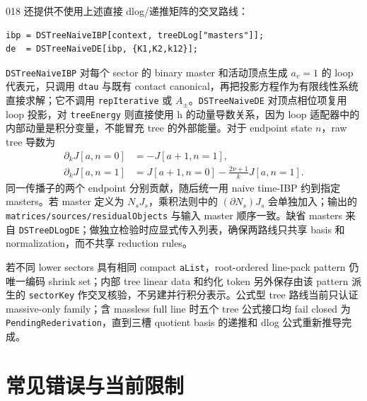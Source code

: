﻿\documentclass[a4paper,11pt]{article}
\begin{document}
018 还提供不使用上述直接 dlog/递推矩阵的交叉路线：
\begin{verbatim}
ibp = DSTreeNaiveIBP[context, treeDLog["masters"]];
de  = DSTreeNaiveDE[ibp, {K1,K2,k12}];
\end{verbatim}
\texttt{DSTreeNaiveIBP} 对每个 sector 的 binary master 和活动顶点生成 $a_v=1$ 的 loop 代表元，只调用 \texttt{dtau} 与既有 contact canonical，再把投影方程作为有限线性系统直接求解；它不调用 \texttt{repIterative} 或 $A_\pm$。\texttt{DSTreeNaiveDE} 对顶点相位项复用 loop 投影，对 \texttt{treeEnergy} 则直接使用 h 的动量导数关系，因为 loop 适配器中的内部动量是积分变量，不能冒充 tree 的外部能量。对于 endpoint state $n$，raw tree 导数为
\begin{align}
 \partial_k J[a,n=0]&=-J[a+1,n=1],\\
 \partial_k J[a,n=1]&=J[a+1,n=0]-\frac{2\nu+1}{k}J[a,n=1].
\end{align}
同一传播子的两个 endpoint 分别贡献，随后统一用 naive time-IBP 约到指定 masters。若 master 定义为 $N_sJ_s$，乘积法则中的 $(\partial N_s)J_s$ 会单独加入；输出的 \texttt{matrices/sources/residualObjects} 与输入 master 顺序一致。缺省 masters 来自 \texttt{DSTreeDLogDE}；做独立检验时应显式传入列表，确保两路线只共享 basis 和 normalization，而不共享 reduction rules。

若不同 lower sectors 具有相同 compact \texttt{aList}，root-ordered line-pack pattern 仍唯一编码 shrink set；内部 tree linear data 和约化 token 另外保存由该 pattern 派生的 \texttt{sectorKey} 作交叉核验，不另建并行积分表示。公式型 tree 路线当前只认证 massive-only family；含 massless full line 时五个 tree 公式接口均 fail closed 为 \texttt{PendingRederivation}，直到三槽 quotient basis 的递推和 dlog 公式重新推导完成。

\section{常见错误与当前限制}
\end{document}
